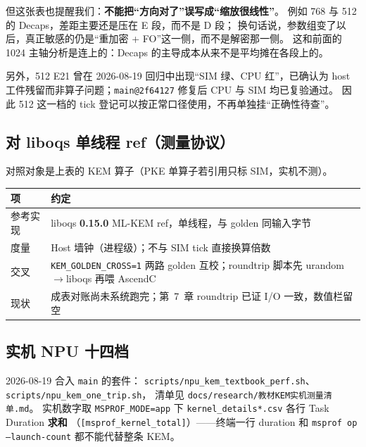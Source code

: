 \documentclass[UTF8,a4paper,11pt]{ctexart}
\theoremstyle{definition}
\theoremstyle{plain}
\theoremstyle{remark}
\numberwithin{figure}{section}
\numberwithin{table}{section}
\begin{document}
但这张表也提醒我们：\textbf{不能把“方向对了”误写成“缩放很线性”}。
例如 768 与 512 的 Decaps，差距主要还是压在 E 段，而不是 D 段；
换句话说，参数组变了以后，真正敏感的仍是“重加密 + FO”这一侧，而不是解密那一侧。
这和前面的 1024 主轴分析是连上的：Decaps 的主导成本从来不是平均摊在各段上的。

另外，512 E21 曾在 2026-08-19 回归中出现“SIM 绿、CPU 红”，已确认为 host 工件残留而非算子问题；\texttt{main@2f64127} 修复后 CPU 与 SIM 均已复验通过。
因此 512 这一档的 tick 登记可以按正常口径使用，不再单独挂“正确性待查”。

\subsection{对 liboqs 单线程 ref（测量协议）}
\label{sec:ch9-liboqs}

对照对象是上表的 KEM 算子（PKE 单算子若引用只标 SIM，实机不测）。

\begin{center}
\small
\begin{tabular}{@{}L{3.5cm}L{9.5cm}@{}}
  \toprule
  项 & 约定 \\
  \midrule
  参考实现 & liboqs \textbf{0.15.0} ML-KEM ref，单线程，与 golden 同输入字节 \\
  度量 & Host 墙钟（进程级）；不与 SIM tick 直接换算倍数 \\
  交叉 & \texttt{KEM\_GOLDEN\_CROSS=1} 两路 golden 互校；roundtrip 脚本先 urandom$\to$liboqs 再喂 AscendC \\
  现状 & 成表对账尚未系统跑完；第~7~章 roundtrip 已证 I/O 一致，数值栏留空 \\
  \bottomrule
\end{tabular}
\end{center}

\subsection{实机 NPU 十四档}
\label{sec:ch9-npu-slot}

2026-08-19 合入 \texttt{main} 的套件：
\texttt{scripts/npu\_kem\_textbook\_perf.sh}、\texttt{scripts/npu\_kem\_one\_trip.sh}，
清单见 \texttt{docs/research/教材KEM实机测量清单.md}。
实机数字取 \texttt{MSPROF\_MODE=app} 下 \texttt{kernel\_details*.csv} 各行 Task Duration \textbf{求和}
（\texttt{[msprof\_kernel\_total]}）——终端一行 duration 和 \texttt{msprof op --launch-count} 都不能代替整条 KEM。
\end{document}
